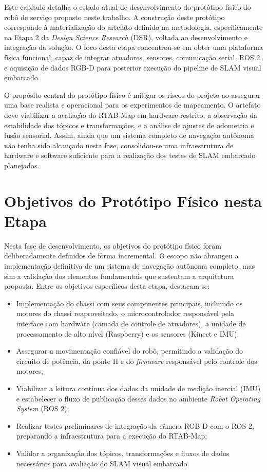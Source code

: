 Este capítulo detalha o estado atual de desenvolvimento do protótipo físico do robô de serviço proposto neste trabalho. A construção deste protótipo corresponde à materialização do artefato definido na metodologia, especificamente na Etapa 2 da \textit{Design Science Research} (DSR), voltada ao desenvolvimento e integração da solução. O foco desta etapa concentrou-se em obter uma plataforma física funcional, capaz de integrar atuadores, sensores, comunicação serial, ROS 2 e aquisição de dados RGB-D para posterior execução do pipeline de SLAM visual embarcado.

O propósito central do protótipo físico é mitigar os riscos do projeto ao assegurar uma base realista e operacional para os experimentos de mapeamento. O artefato deve viabilizar a avaliação do RTAB-Map em hardware restrito, a observação da estabilidade dos tópicos e transformações, e a análise de ajustes de odometria e fusão sensorial. Assim, ainda que um sistema completo de navegação autônoma não tenha sido alcançado nesta fase, consolidou-se uma infraestrutura de hardware e software suficiente para a realização dos testes de SLAM embarcado planejados.

\section{Objetivos do Protótipo Físico nesta Etapa}

Nesta fase de desenvolvimento, os objetivos do protótipo físico foram deliberadamente definidos de forma incremental. O escopo não abrangeu a implementação definitiva de um sistema de navegação autônoma completo, mas sim a validação dos elementos fundamentais que sustentam a arquitetura proposta. Entre os objetivos específicos desta etapa, destacam-se:

\begin{itemize}
    \item Implementação do chassi com seus componentes principais, incluindo os motores do chassi reaproveitado, o microcontrolador responsável pela interface com hardware (camada de controle de atuadores), a unidade de processamento de alto nível (Raspberry) e os sensores (Kinect e IMU).
    \item Assegurar a movimentação confiável do robô, permitindo a validação do circuito de potência, da ponte H e do \textit{firmware} responsável pelo controle dos motores;
    \item Viabilizar a leitura contínua dos dados da unidade de medição inercial (IMU) e estabelecer o fluxo de publicação desses dados no ambiente \textit{Robot Operating System} (ROS 2);
    \item Realizar testes preliminares de integração da câmera RGB-D com o ROS 2, preparando a infraestrutura para a execução do RTAB-Map;
    \item Validar a organização dos tópicos, transformações e fluxos de dados necessários para avaliação do SLAM visual embarcado.
\end{itemize}

